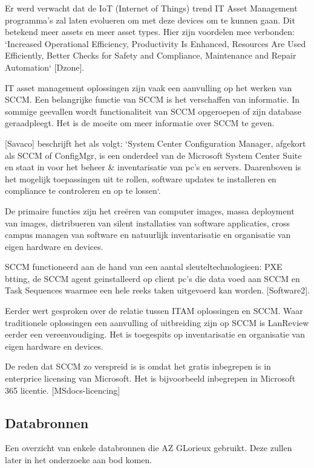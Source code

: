 Er werd verwacht dat de IoT (Internet of Things) trend IT Asset Management programma's zal laten evolueren om met deze devices om te kunnen gaan. Dit betekend meer assets en meer asset types. Hier zijn voordelen mee verbonden: `Increased Operational Efficiency, Productivity Is Enhanced, Resources Are Used Efficiently, Better Checks for Safety and Compliance, Maintenance and Repair Automation` [Dzone].

IT asset management oplossingen zijn vaak een aanvulling op het werken van SCCM. Een belangrijke functie van SCCM is het verschaffen van informatie. In sommige geevallen wordt functionaliteit van SCCM opgeroepen of zijn database geraadpleegt. Het is de moeite om meer informatie over SCCM te geven.

[Savaco] beschrijft het als volgt: `System Center Configuration Manager, afgekort als SCCM of ConfigMgr, is een onderdeel van de Microsoft System Center Suite en staat in voor het beheer \& inventarisatie van pc's en servers. Daarenboven is het mogelijk toepassingen uit te rollen, software updates te installeren en compliance te controleren en op te lossen`.

De primaire functies zijn het creëren van computer images, massa deployment van images, distribueren van silent installaties van software applicaties, cross campus managen van software en natuurlijk inventarisatie en organisatie van eigen hardware en devices.

SCCM functioneerd aan de hand van een aantal sleuteltechnologieen: PXE btting, de SCCM agent geinstalleerd op client pc's die data voed aan SCCM en Task Sequences waarmee een hele reeks taken uitgevoerd kan worden. [Software2].

Eerder wert gesproken over de relatie tussen ITAM oplossingen en SCCM. Waar traditionele oplossingen een aanvulling of uitbreiding zijn op SCCM is LanReview eerder een vereenvoudiging. Het is toegespits op inventarisatie en organisatie van eigen hardware en devices.

De reden dat SCCM zo verspreid is is omdat het gratis inbegrepen is in enterprice licensing van Microsoft. Het is bijvoorbeeld inbegrepen in Microsoft 365 licentie. [MSdocs-licencing]

\subsection{Databronnen}

Een overzicht van enkele databronnen die AZ GLorieux gebruikt. Deze zullen later in het onderzoeke aan bod komen.

